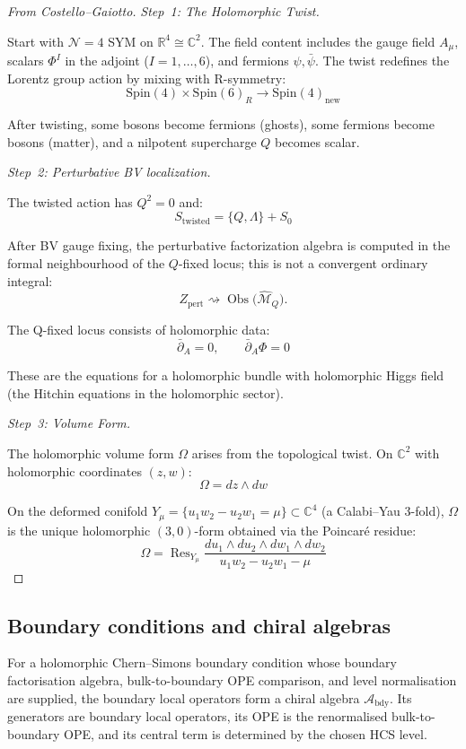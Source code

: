 \begin{proof}[From Costello--Gaiotto]
\emph{Step~1: The Holomorphic Twist.}

Start with $\mathcal{N}=4$ SYM on $\mathbb{R}^4 \cong \mathbb{C}^2$. The field
content includes the gauge field $A_\mu$, scalars $\Phi^I$ in the adjoint ($I=1,\ldots,6$), and fermions $\psi, \bar{\psi}$. The twist redefines the Lorentz group action by mixing with R-symmetry:
\[\text{Spin}(4) \times \text{Spin}(6)_R \to \text{Spin}(4)_{\text{new}}\]

After twisting, some bosons become fermions (ghosts), some fermions become bosons (matter), and a nilpotent supercharge $Q$ becomes scalar.

\emph{Step~2: Perturbative BV localization.}

The twisted action has $Q^2 = 0$ and:
\[S_{\text{twisted}} = \{Q, \Lambda\} + S_0\]

After BV gauge fixing, the perturbative factorization algebra is
computed in the formal neighbourhood of the \(Q\)-fixed locus; this is
not a convergent ordinary integral:
\[Z_{\mathrm{pert}}
  \rightsquigarrow
  \operatorname{Obs}\bigl(\widehat{\mathcal{M}}_{Q}\bigr).\]

The Q-fixed locus consists of holomorphic data:
\[\bar{\partial}_A = 0, \qquad \bar{\partial}_A \Phi = 0\]

These are the equations for a holomorphic bundle with holomorphic Higgs field (the Hitchin equations in the holomorphic sector).

\emph{Step~3: Volume Form.}

The holomorphic volume form $\Omega$ arises from the topological twist. On
$\mathbb{C}^2$ with holomorphic coordinates $(z,w)$:
\[\Omega = dz \wedge dw\]

On the deformed conifold $Y_\mu = \{u_1 w_2 - u_2 w_1 = \mu\} \subset \mathbb{C}^4$ (a Calabi--Yau 3-fold), $\Omega$ is the unique holomorphic $(3,0)$-form obtained via the Poincar\'{e} residue:
\[\Omega = \operatorname{Res}_{Y_\mu}\frac{du_1 \wedge du_2 \wedge dw_1 \wedge dw_2}{u_1 w_2 - u_2 w_1 - \mu}\]
\end{proof}

\subsection{Boundary conditions and chiral algebras}

\begin{theorem}
For a holomorphic Chern--Simons boundary condition whose boundary
factorisation algebra, bulk-to-boundary OPE comparison, and level
normalisation are supplied, the boundary local operators form a chiral
algebra $\mathcal{A}_{\text{bdy}}$. Its generators are boundary local
operators, its OPE is the renormalised bulk-to-boundary OPE, and its
central term is determined by the chosen HCS level.
\end{theorem}


